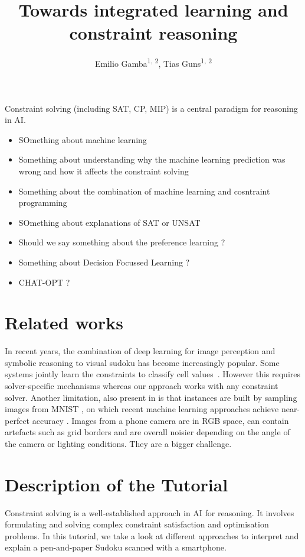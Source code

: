 \documentclass[letterpaper]{article} %
\title{Towards integrated learning and constraint reasoning}
\author{
    Emilio Gamba\textsuperscript{\rm1, \rm 2},
    Tias Guns\textsuperscript{\rm1, \rm 2}
}
\begin{document}
\maketitle
 
 
Constraint solving (including SAT, CP, MIP) is a central paradigm for reasoning in AI.
\begin{itemize}
	\item SOmething about machine learning
	\item Something about understanding why the machine learning prediction was wrong and how it affects the constraint solving
	\item Something about the combination of machine learning and cosntraint programming
	\item SOmething about explanations of SAT or UNSAT
	\item Should we say something about the preference learning ? 
	\item Something about Decision Focussed Learning ?
	\item CHAT-OPT ?
\end{itemize} 
 
 \section{Related works}
In recent years, the combination of deep learning for image perception and symbolic reasoning to visual sudoku has become increasingly popular.
Some systems jointly learn the constraints to classify cell values~\cite{Pushing, SATNet, NeurASP}. 
However this requires solver-specific mechanisms whereas our approach works with any constraint  solver. 
Another limitation, also present in \cite{CLRD, mulamba2020hybrid} is that instances are built by sampling images from MNIST \cite{mnist}, on which recent machine learning approaches achieve near-perfect accuracy \cite{ensemble-mnist}. Images from a phone camera are in RGB space, can contain artefacts such as grid borders and are overall noisier depending on the angle of the camera or lighting conditions. They are a bigger challenge. 

\section{Description of the Tutorial}

Constraint solving is a well-established approach in AI for reasoning. It involves formulating and solving complex constraint satisfaction and optimisation problems.
In this tutorial, we take a look at different approaches to interpret and explain a pen-and-paper Sudoku scanned with a smartphone.
\end{document}
